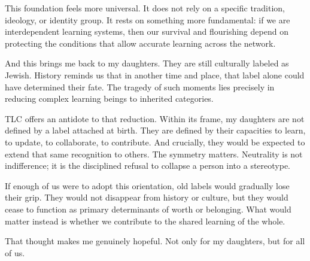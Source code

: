 \documentclass[11pt]{article}
\begin{document}
This foundation feels more universal. It does not rely on a specific tradition, ideology, or identity group. It rests on something more fundamental: if we are interdependent learning systems, then our survival and flourishing depend on protecting the conditions that allow accurate learning across the network.

And this brings me back to my daughters. They are still culturally labeled as Jewish. History reminds us that in another time and place, that label alone could have determined their fate. The tragedy of such moments lies precisely in reducing complex learning beings to inherited categories.

TLC offers an antidote to that reduction. Within its frame, my daughters are not defined by a label attached at birth. They are defined by their capacities to learn, to update, to collaborate, to contribute. And crucially, they would be expected to extend that same recognition to others. The symmetry matters. Neutrality is not indifference; it is the disciplined refusal to collapse a person into a stereotype.

If enough of us were to adopt this orientation, old labels would gradually lose their grip. They would not disappear from history or culture, but they would cease to function as primary determinants of worth or belonging. What would matter instead is whether we contribute to the shared learning of the whole.

That thought makes me genuinely hopeful. Not only for my daughters, but for all of us.
\end{document}
